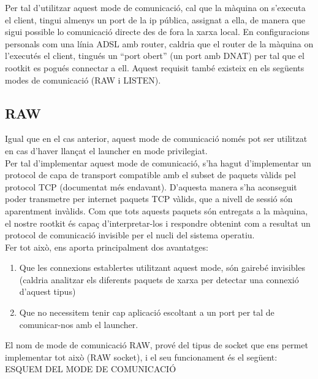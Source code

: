 Per tal d'utilitzar aquest mode de comunicació, cal que la màquina on s'executa el client, tingui almenys
un port de la ip pública, assignat a ella, de manera que sigui possible lo comunicació directe des de fora
la xarxa local. En configuracions personals com una línia ADSL amb router, caldria que el router de la màquina
on l'executés el client, tingués un ``port obert'' (un port amb DNAT) per tal que el rootkit es pogués 
connectar a ell. Aquest requisit també existeix en els següents modes de comunicació (RAW i LISTEN). \\

\subsection{RAW}

Igual que en el cas anterior, aquest mode de comunicació només pot ser utilitzat en cas d'haver llançat el launcher
en mode privilegiat. \\

Per tal d'implementar aquest mode de comunicació, s'ha hagut d'implementar un protocol de capa de transport 
compatible amb el subset de paquets vàlids pel protocol TCP (documentat més endavant). D'aquesta manera s'ha 
aconseguit poder transmetre per internet paquets TCP vàlids, que a nivell de sessió són aparentment invàlids. 
Com que tots aquests paquets són entregats a la màquina, el nostre rootkit és capaç d'interpretar-los i 
respondre obtenint com a resultat un protocol de comunicació invisible per el nucli del sistema operatiu. \\

Fer tot això, ens aporta principalment dos avantatges: \\

\begin{enumerate}
    \item Que les connexions establertes utilitzant aquest mode, són gairebé invisibles (caldria analitzar els
        diferents paquets de xarxa per detectar una connexió d'aquest tipus)
    \item Que no necessitem tenir cap aplicació escoltant a un port per tal de comunicar-nos amb el launcher.
\end{enumerate}

El nom de mode de comunicació RAW, prové del tipus de socket que ens permet implementar tot això (RAW socket),
i el seu funcionament és el següent: \\

ESQUEM DEL MODE DE COMUNICACIÓ \\

